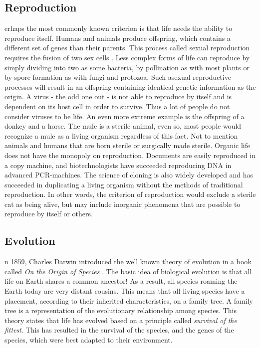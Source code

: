 \subsection{Reproduction}
erhaps the most commonly known criterion is that life needs the ability to reproduce itself.
Humans and animals produce offspring, which contains a different set of genes than their parents.
This process called sexual reproduction requires the fusion of two sex cells \cite{reprod}.
Less complex forms of life can reproduce by simply dividing into two as some bacteria, by pollination as with most plants or by spore formation as with fungi and protozoa.
Such asexual reproductive processes will result in an offspring containing identical genetic information as the origin.
A virus - the odd one out - is not able to reproduce by itself and is dependent on its host cell in order to survive.
Thus a lot of people do not consider viruses to be life.
An even more extreme example is the offspring of a donkey and a horse.
The mule is a sterile animal, even so, most people would recognize a mule as a living organism regardless of this fact. 
Not to mention animals and humans that are born sterile or surgically made sterile.
Organic life does not have the monopoly on reproduction. Documents are easily reproduced in a copy machine, and biotechnologists have succeeded reproducing DNA in advanced PCR-machines.
The science of cloning is also widely developed and has succeeded in duplicating a living organism without the methods of traditional reproduction.
In other words, the criterion of reproduction would exclude a sterile cat as being alive, but may include inorganic phenomena that are possible to reproduce by itself or others.

\subsection{Evolution}
n 1859, Charles Darwin introduced the well known theory of evolution in a book called \emph{On the Origin of Species} \cite{Darwin}.
The basic idea of biological evolution is that all life on Earth shares a common ancestor!
As a result, all species roaming the Earth today are very distant cousins.
This means that all living species have a placement, according to their inherited characteristics, on a family tree.
A family tree is a representation of the evolutionary relationship among species.
This theory states that life has evolved based on a principle called \emph{survival of the fittest}.
This has resulted in the survival of the species, and the genes of the species, which were best adapted to their environment. 


